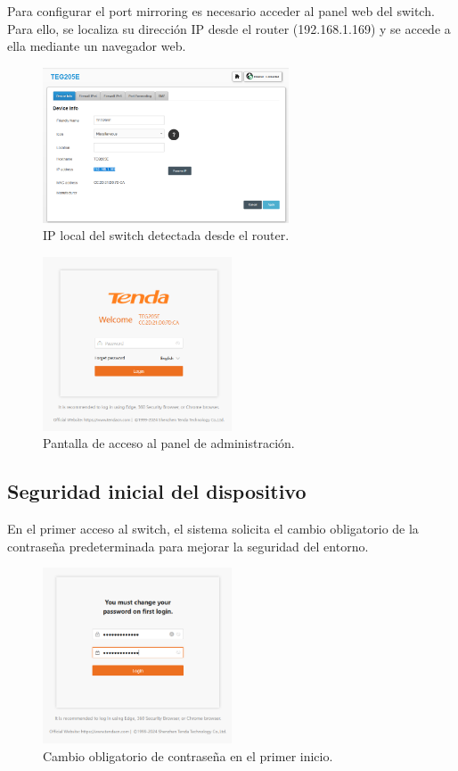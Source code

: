 \documentclass[12pt,a4paper]{report}
\begin{document}
Para configurar el port mirroring es necesario acceder al panel web del switch. Para ello, se localiza su dirección IP desde el router (192.168.1.169) y se accede a ella mediante un navegador web.

\begin{figure}[H]
	\centering
	\includegraphics[width=0.65\textwidth]{pruebas_config/4-localizar_tenda.png}
	\caption{IP local del switch detectada desde el router.}
\end{figure}

\begin{figure}[H]
	\centering
	\includegraphics[width=0.5\textwidth]{pruebas_config/5-tenda_web.png}
	\caption{Pantalla de acceso al panel de administración.}
\end{figure}

\pagebreak

\subsection*{Seguridad inicial del dispositivo}

En el primer acceso al switch, el sistema solicita el cambio obligatorio de la contraseña predeterminada para mejorar la seguridad del entorno.

\begin{figure}[H]
	\centering
	\includegraphics[width=0.5\textwidth]{pruebas_config/6-cambio_pass_tenda.png}
	\caption{Cambio obligatorio de contraseña en el primer inicio.}
\end{figure}
\end{document}

